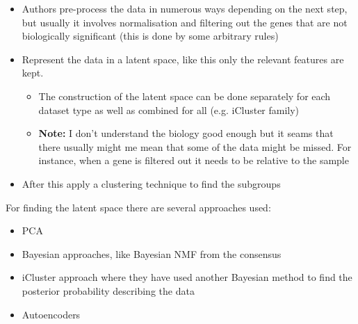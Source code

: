 \begin{itemize}
    \item Authors pre-process the data in numerous ways depending on the next step, but usually it involves normalisation and filtering out the genes that are not biologically significant (this is done by some arbitrary rules)
    
    \item Represent the data in a latent space, like this only the relevant features are kept. 
    \begin{itemize}
        \item The construction of the latent space can be done separately for each dataset type as well as combined for all (e.g. iCluster family)
        \item \textbf{Note:} I don't understand the biology good enough but it seams that there usually might me mean that some of the data might be missed. For instance, when a gene is filtered out it needs to be relative to the sample
    \end{itemize}
    
    \item After this apply a clustering technique to find the subgroups
\end{itemize}

For finding the latent space there are several approaches used:

\begin{itemize}
    \item PCA
    \item Bayesian approaches, like Bayesian NMF from the consensus 
    \item iCluster approach where they have used another Bayesian method to find the posterior probability describing the data
    \item Autoencoders
    
\end{itemize}


\newpage


